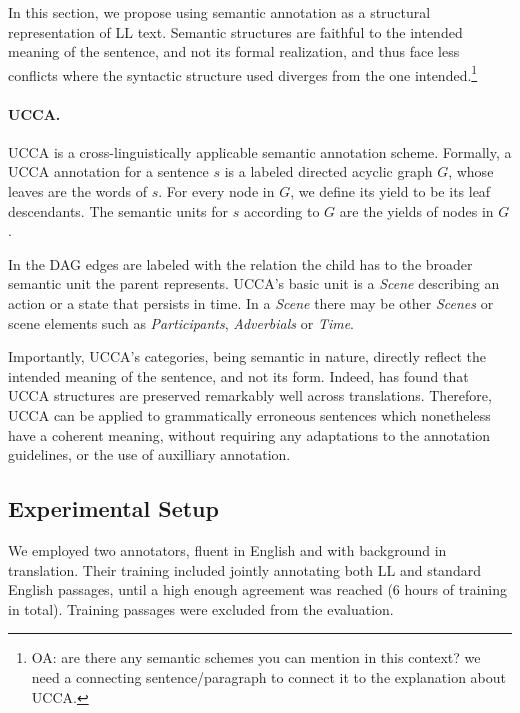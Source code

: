 \documentclass[letter,11pt]{article}
\newcommand{\oa}[1]{\footnote{\color{red}OA: #1}}
\begin{document}

In this section, we propose using semantic annotation as a structural
representation of LL text. Semantic structures are faithful to the intended
meaning of the sentence, and not its formal realization, and thus face
less conflicts where the syntactic structure used diverges from
the one intended.\oa{are there any semantic schemes you can mention in this context? we need
a connecting sentence/paragraph to connect it to the explanation about UCCA.}


\paragraph{UCCA.}\label{sec:ucca}

UCCA is a cross-linguistically applicable semantic annotation scheme. Formally, 
a UCCA annotation for a sentence $s$ is a labeled directed acyclic graph $G$, whose
leaves are the words of $s$. For every node in $G$,
we define its yield to be its leaf descendants. The
semantic units for $s$ according to $G$ are the yields
of nodes in $G$.

In the DAG edges are labeled with the relation the child has to the broader semantic unit
the parent represents. UCCA's basic unit is a \textit{Scene} describing an action or a state
that persists in time. In a \textit{Scene} there may be other \textit{Scenes} or scene elements
such as \textit{Participants}, \textit{Adverbials} or \textit{Time}.

Importantly, UCCA's categories, being semantic in nature, directly reflect the intended
meaning of the sentence, and not its form. Indeed,  has found
that UCCA structures are preserved remarkably well across translations.
Therefore, UCCA can be applied to grammatically erroneous
sentences which nonetheless have a coherent meaning, without requiring any adaptations
to the annotation guidelines, or the use of auxilliary annotation.


\subsection{Experimental Setup}

We employed two annotators, fluent in English and with background in translation.
Their training included jointly annotating both LL and standard English
passages, until a high enough agreement was reached (6 hours of training in total).
Training passages were excluded from the evaluation.
\end{document}
